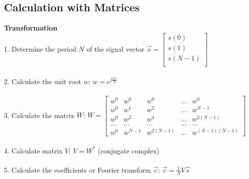     \subsection{Calculation with Matrices}
        \textbf{Transformation}\\
        1. Determine the period $N$ of the signal vector $\vec{s}=
        \begin{bmatrix}
        s(0) \\
        s(1) \\
        s(N-1)\\
        \end{bmatrix}$\\ \\
        2. Calculate the unit root $w$: $w=e^{j\frac{2 \pi}{N}}$\\ \\
        3. Calculate the matrix $W$: $W=
        \begin{bmatrix}
        w^0 & w^0 & w^0 & \ldots & w^0\\
        w^0 & w^1 & w^2 & \ldots & w^{N-1}\\
        w^0 & w^2 & w^4 & \ldots & w^{2(N-1)}\\
        \ldots & \ldots & \ldots & \ldots & \ldots\\
        w^0 & w^{N-1} & w^{2(N-1)} & \ldots & w^{(N-1)(N-1)}
        \end{bmatrix}$\\ \\
        4. Calculate matrix $V$: $V=W^*$ (conjugate complex)\\ \\
        5. Calculate the coefficients or Fourier transform $\vec{c}$:
        $\vec{c}=\frac{1}{N}V\vec{s}$\\

